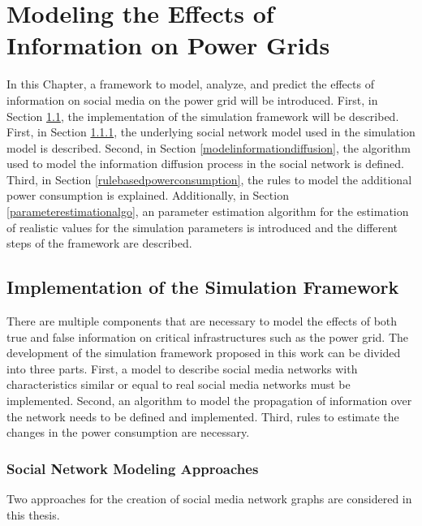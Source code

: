 \chapter{Modeling the Effects of Information on Power Grids}
\label{implementationall}
In this Chapter, a framework to model, analyze, and predict 
the effects of information on social media on the 
power grid will be introduced.
First, in Section \ref{simulationframeworksection}, 
the implementation of the simulation framework will be described.
First, in Section \ref{modelsocialnetwork}, the underlying social network model
used in the simulation model is described. Second, in Section 
\ref{modelinformationdiffusion}, the algorithm used to model
the information diffusion process in the social network is 
defined. Third, in Section \ref{rulebasedpowerconsumption}, 
the rules to model the additional power consumption is explained.
Additionally, in Section \ref{parameterestimationalgo},
an parameter estimation algorithm for the estimation of 
realistic values for the simulation parameters is introduced and 
the different steps of the framework are described.

\section{Implementation of the Simulation Framework}
\label{simulationframeworksection}
There are multiple components that are necessary to model the effects of 
both true and false information on critical infrastructures
such as the power grid. The development of the simulation framework
proposed in this work can be divided into three parts. First, a model 
to describe social media networks with characteristics similar 
or equal to real social media networks must be implemented.
Second, an algorithm to model the 
propagation of information over the network needs to be defined and 
implemented. Third, rules to estimate the changes in the power consumption 
are necessary.

\subsection{Social Network Modeling Approaches}
\label{modelsocialnetwork}
Two approaches for the creation of social media network graphs 
are considered in this thesis.

